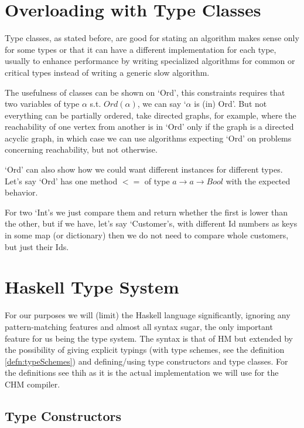\section{Overloading with Type Classes}

Type classes, as stated before, are good for stating an algorithm makes sense only for some types or that it can have a different implementation for each type, usually to enhance performance by writing specialized algorithms for common or critical types instead of writing a generic slow algorithm.

The usefulness of classes can be shown on `Ord', this constraints requires that two variables of type $\alpha$ s.t. $Ord(\alpha)$, we can say `$\alpha$ is (in) Ord'. But not everything can be partially ordered, take directed graphs, for example, where the reachability of one vertex from another is in `Ord' only if the graph is a directed acyclic graph, in which case we can use algorithms expecting `Ord' on problems concerning reachability, but not otherwise.

`Ord' can also show how we could want different instances for different types. Let's say `Ord' has one method $<=$ of type $a \rightarrow a \rightarrow Bool$ with the expected behavior.

For two `Int's we just compare them and return whether the first is lower than the other, but if we have, let's say `Customer's, with different Id numbers as keys in some map (or dictionary) then we do not need to compare whole customers, but just their Ids.

\section{Haskell Type System}

For our purposes we will (limit) the Haskell language significantly, ignoring any pattern-matching features and almost all syntax sugar, the only important feature for us being the type system. The syntax is that of HM but extended by the possibility of giving explicit typings (with type schemes, see the definition \ref{defn:typeSchemes}) and defining/using type constructors and type classes. For the  definitions see thih \cite{jones1999typing} as it is the actual implementation we will use for the CHM compiler.

\subsection{Type Constructors}

